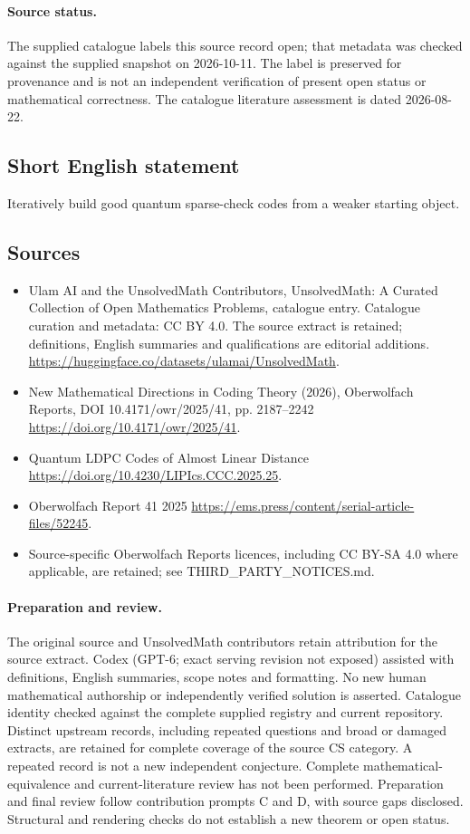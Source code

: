 \documentclass[11pt]{article}
\begin{document}
\paragraph{Source status.}
The supplied catalogue labels this source record open; that metadata was checked against the supplied snapshot on 2026-10-11. The label is preserved for provenance and is not an independent verification of present open status or mathematical correctness. The catalogue literature assessment is dated 2026-08-22.
\subsection{Short English statement}
Iteratively build good quantum sparse-check codes from a weaker starting object.
\subsection{Sources}
\begin{itemize}
\item[\hypertarget{source:statement:1}{S1}] Ulam AI and the UnsolvedMath Contributors, UnsolvedMath: A Curated Collection of Open Mathematics Problems, catalogue entry. Catalogue curation and metadata: CC BY 4.0. The source extract is retained; definitions, English summaries and qualifications are editorial additions.
\url{https://huggingface.co/datasets/ulamai/UnsolvedMath}.
\item[\hypertarget{source:statement:2}{S2}] New Mathematical Directions in Coding Theory (2026), Oberwolfach Reports, DOI 10.4171/owr/2025/41, pp. 2187--2242
\url{https://doi.org/10.4171/owr/2025/41}.
\item[\hypertarget{source:statement:3}{S3}] Quantum LDPC Codes of Almost Linear Distance
\url{https://doi.org/10.4230/LIPIcs.CCC.2025.25}.
\item[\hypertarget{source:statement:4}{S4}] Oberwolfach Report 41 2025
\url{https://ems.press/content/serial-article-files/52245}.
\item Source-specific Oberwolfach Reports licences, including CC BY-SA 4.0 where applicable, are retained; see THIRD\_PARTY\_NOTICES.md.
\end{itemize}
\paragraph{Preparation and review.}
The original source and UnsolvedMath contributors retain attribution for the source extract. Codex (GPT-6; exact serving revision not exposed) assisted with definitions, English summaries, scope notes and formatting. No new human mathematical authorship or independently verified solution is asserted. Catalogue identity checked against the complete supplied registry and current repository. Distinct upstream records, including repeated questions and broad or damaged extracts, are retained for complete coverage of the source CS category. A repeated record is not a new independent conjecture. Complete mathematical-equivalence and current-literature review has not been performed. Preparation and final review follow contribution prompts C and D, with source gaps disclosed. Structural and rendering checks do not establish a new theorem or open status.
\label{end:statement}
\end{document}
